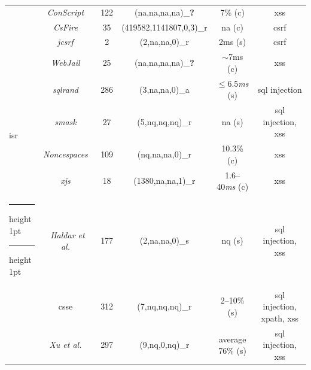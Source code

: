 \documentclass[conference]{IEEEtran}
\makeatletter
\newcommand{\tick}{\ding{52}}
\newcommand{\xmark}{\ding{56}}
\newcommand{\thickhline}{%
    \noalign {\ifnum 0=`}\fi \hrule height 1pt
    \futurelet \reserved@a \@xhline
}
\makeatother
\begin{document}
\begin{landscape}
\begin{table}
\begin{threeparttable}
\begin{small}
{\begin{tabular}{l|c|c|cc|c}
  &   {\it ConScript}~\cite{ML10} & 122 & ({\sc na},{\sc na},{\sc na},{\sc na})\_{\bf ?} & 7\% ({\sc c}) & {\sc xss} \\
  &   {\it CsFire}~\cite{DDHPJ10} & 35 & (419582,1141807,0,3)\_r\tnote{4} & {\sc na} ({\sc c}) & {\sc csrf} \\
  &   {\it j{\sc csrf}}~\cite{PS11} & 2 & (2,{\sc na},{\sc na},0)\_r & 2ms ({\sc s}) & {\sc csrf} \\
  &   {\it WebJail}~\cite{VDDPJ11} & 25 & ({\sc na},{\sc na},{\sc na},{\sc na})\_{\bf ?} & $\sim$7ms ({\sc c}) & {\sc xss} \\
  \hline
  \multirow{4}{*}{{\sc isr}}
  &   {\it {\sc sql}rand}~\cite{BK04} & 286 & (3,{\sc na},{\sc na},0)\_a & $\le$6.5{\it ms} ({\sc s}) & {\sc sql} injection \\
  &   {\it {\sc sm}ask}~\cite{JB07} & 27 & (5,{\sc nq},{\sc nq},{\sc nq})\_r  & {\sc na} ({\sc s}) & {\sc sql} injection, {\sc xss} \\
  &   {\it Noncespaces}~\cite{GC09} & 109 & ({\sc nq},{\sc na},{\sc na},0)\_r &  10.3\% ({\sc c}) & {\sc xss} \\ 
  &   {\it x{\sc js}}~\cite{APKLM10} & 18 & (1380,{\sc na},{\sc na},1)\_r & 1.6--40{\it ms} ({\sc c}) & {\sc xss} \\
  \thickhline
  \thickhline
	\multirow{7}{*}{Taint Tracking}
  &   {\it Haldar et al.}~\cite{HCF05} & 177 & (2,{\sc na},{\sc na},0)\_s & {\sc nq} ({\sc s}) & {\sc sql} injection, {\sc xss} \\ 
	&  	{\sc csse}~\cite{PB05} & 312 & (7,{\sc nq},{\sc nq},{\sc nq})\_r & 2--10\% ({\sc s}) & {\sc sql} injection, {\sc xp}ath, {\sc xss} \\
	&  	{\it Xu et al.}~\cite{XBS06} & 297 & (9,{\sc nq},0,{\sc nq})\_r & average 76\% ({\sc s}) & {\sc sql} injection, {\sc xss} \\ 

\end{tabular}}
\end{small}
\end{threeparttable}
\end{table}
\end{landscape}
\end{document}
